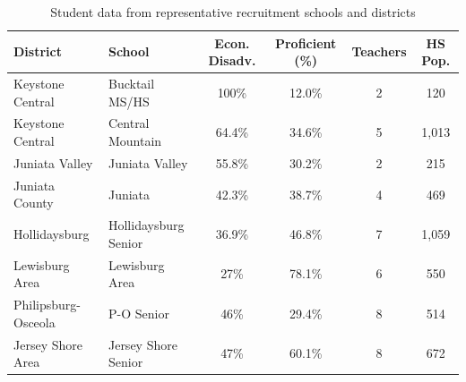 \documentclass[11pt]{article}
\begin{document}






\vspace{-3mm}
\begin{table}[h]
\footnotesize
\centering
\caption{Student data from representative recruitment schools and districts}
\vspace{-3mm}
\label{tab:school_recruitment_data}
\begin{tabular}{|l|l|c|c|c|c|}
\hline
\rowcolor{mycmykcolor}
\textbf{District} & \textbf{School} & \textbf{Econ. Disadv.} & \textbf{Proficient (\%)} & \textbf{Teachers} & \textbf{HS Pop.} \\ \hline
Keystone Central & Bucktail MS/HS & 100\% & 12.0\% & 2 & 120 \\ \hline
Keystone Central & Central Mountain & 64.4\% & 34.6\% & 5 & 1,013 \\ \hline
Juniata Valley & Juniata Valley & 55.8\% & 30.2\% & 2 & 215 \\ \hline
Juniata County & Juniata & 42.3\% & 38.7\% & 4 & 469 \\ \hline
Hollidaysburg & Hollidaysburg Senior & 36.9\% & 46.8\% & 7 & 1,059 \\ \hline
Lewisburg Area & Lewisburg Area & 27\% & 78.1\% & 6 & 550 \\ \hline
Philipsburg-Osceola & P-O Senior & 46\% & 29.4\% & 8 & 514 \\ \hline
Jersey Shore Area & Jersey Shore Senior & 47\% & 60.1\% & 8 & 672 \\ \hline
\end{tabular}
\vspace{-4mm}
\end{table}
\end{document}
